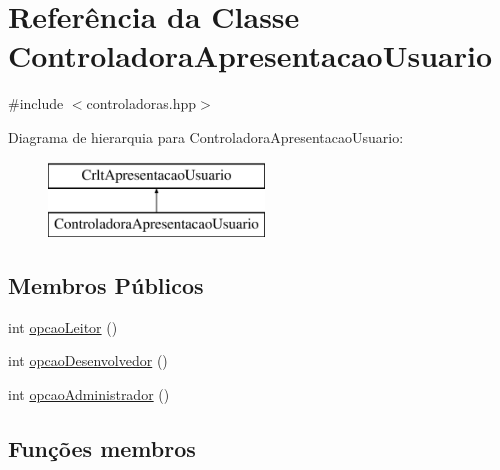 \hypertarget{class_controladora_apresentacao_usuario}{}\section{Referência da Classe Controladora\+Apresentacao\+Usuario}
\label{class_controladora_apresentacao_usuario}


{\ttfamily \#include $<$controladoras.\+hpp$>$}

Diagrama de hierarquia para Controladora\+Apresentacao\+Usuario\+:\begin{figure}[H]
\begin{center}
\leavevmode
\includegraphics[height=2.000000cm]{class_controladora_apresentacao_usuario}
\end{center}
\end{figure}
\subsection*{Membros Públicos}
\begin{DoxyCompactItemize}
\item 
int \mbox{\hyperlink{class_controladora_apresentacao_usuario_a22b31c99a738845f00ec2703c1c6dded}{opcao\+Leitor}} ()
\item 
int \mbox{\hyperlink{class_controladora_apresentacao_usuario_a1d9f2e8522d9e0eefaf08caca98008c2}{opcao\+Desenvolvedor}} ()
\item 
int \mbox{\hyperlink{class_controladora_apresentacao_usuario_ae4d0223e4aabe11b58039c84c80503c9}{opcao\+Administrador}} ()
\end{DoxyCompactItemize}


\subsection{Funções membros}
\mbox{\label{class_controladora_apresentacao_usuario_ae4d0223e4aabe11b58039c84c80503c9}} 
